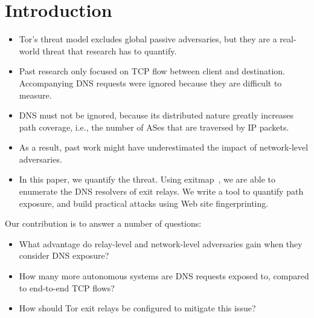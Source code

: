 \section{Introduction}
\label{sec:introduction}

\begin{itemize}
	\item Tor's threat model excludes global passive adversaries, but they are a
		real-world threat that research has to quantify.

	\item Past research only focused on TCP flow between client and destination.
		Accompanying DNS requests were ignored because they are difficult to
		measure.

	\item DNS must not be ignored, because its distributed nature greatly
		increases path coverage, i.e., the number of ASes that are traversed by
		IP packets.

	\item As a result, past work might have underestimated the impact of
		network-level adversaries.

	\item In this paper, we quantify the threat.  Using
		exitmap~\cite{Winter2014b}, we are able to enumerate the DNS resolvers
		of exit relays.  We write a tool to quantify path exposure, and build
		practical attacks using Web site fingerprinting.
\end{itemize}

Our contribution is to answer a number of questions:
\begin{itemize}
	\item What advantage do relay-level and network-level adversaries gain when
		they consider DNS exposure?

	\item How many more autonomous systems are DNS requests exposed to, compared
		to end-to-end TCP flows?

	\item How should Tor exit relays be configured to mitigate this issue?
\end{itemize}

